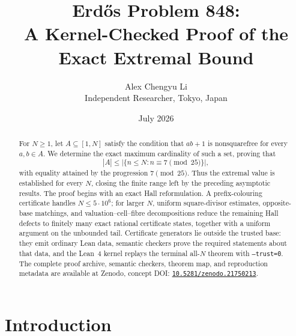 \documentclass[11pt]{article}
\title{\textbf{Erd\H{o}s Problem 848:\\
A Kernel-Checked Proof of the Exact Extremal Bound}}
\author{Alex Chengyu Li\\[3pt]
\small Independent Researcher, Tokyo, Japan}
\date{July 2026}
\theoremstyle{definition}
\newcommand{\leanname}[1]{}
\newcommand{\FiveMillion}{5\cdot10^6}
\begin{document}
\maketitle

\begin{abstract}
For $N\geq1$, let $A\subseteq[1,N]$ satisfy the condition that $ab+1$ is
nonsquarefree for every $a,b\in A$.  We determine the exact maximum
cardinality of such a set, proving that
\[
 |A|\leq \bigl|\{n\leq N:n\equiv7\pmod {25}\}\bigr|,
\]
with equality attained by the progression $7\pmod {25}$.  Thus the
extremal value is established for every $N$, closing the finite range left
by the preceding asymptotic results.  The proof begins with an exact Hall
reformulation.  A prefix-colouring certificate handles
$N\leq\FiveMillion$; for larger $N$, uniform square-divisor estimates,
opposite-base matchings, and valuation--cell--fibre decompositions reduce
the remaining Hall defects to finitely many exact rational certificate
states, together with a uniform argument on the unbounded tail.
Certificate generators lie outside the trusted base: they emit ordinary
Lean data, semantic checkers prove the required statements about that data,
and the Lean~4 kernel replays the terminal all-$N$ theorem with
\texttt{--trust=0}.  The complete proof archive, semantic checkers, theorem
map, and reproduction metadata are available at Zenodo, concept DOI:
\href{https://doi.org/10.5281/zenodo.21750213}%
{\nolinkurl{10.5281/zenodo.21750213}}.
\end{abstract}

\leanname{NonSquarefreeProductProp}
\leanname{OriginalProblem848Statement}
\leanname{originalA7_has_property}
\leanname{originalProblem_of_hallStatement}
\leanname{erdos848HallStatement_iff_originalProblem}
\leanname{erdos848_through_five_million}
\leanname{PaperCertificateProvider.fiveToTenMillion}
\leanname{PaperCertificateProvider.tenToTwentyMillion}
\leanname{PaperCertificateProvider.twentyToFortyMillion}
\leanname{erdos848FortyMillionClose_kernel}
\leanname{PaperCertificateProvider.twoHundredToTwoBillion}
\leanname{PaperCertificateProvider.twoBillionTail}
\leanname{PaperCertificateProvider.fortyMillionTail}
\leanname{erdos848_paper_tail_close}
\leanname{PaperGeneratedCertificateProvider.all_N}

\section{Introduction}
\end{document}
